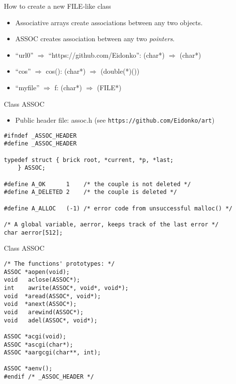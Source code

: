 \begin{frame}[fragile]{How to create a new FILE-like class}
\begin{itemize}
\item Associative arrays create associations between any two
objects.
\item ASSOC creates association between any two \emph{pointers}.
\item ``url0'' $\Rightarrow$ ``https://github.com/Eidonko'':
(char*) $\Rightarrow$ (char*)
\item ``cos''  $\Rightarrow$ cos():
(char*) $\Rightarrow$ (double(*)())
\item ``myfile'' $\Rightarrow$ f:
(char*) $\Rightarrow$ (FILE*)
\end{itemize}

\end{frame}
\begin{frame}[fragile]{Class ASSOC}
\begin{itemize}
\item Public header file: assoc.h (see \verb"https://github.com/Eidonko/art")
\end{itemize}

\begin{small}
\begin{verbatim}
#ifndef _ASSOC_HEADER
#define _ASSOC_HEADER

typedef struct { brick root, *current, *p, *last;
	} ASSOC;

#define A_OK      1    /* the couple is not deleted */
#define A_DELETED 2    /* the couple is deleted */

#define A_ALLOC   (-1) /* error code from unsuccessful malloc() */

/* A global variable, aerror, keeps track of the last error */
char aerror[512];
\end{verbatim}
\end{small}




\end{frame}
\begin{frame}[fragile]{Class ASSOC}
\begin{small}
\begin{verbatim}
/* The functions' prototypes: */
ASSOC *aopen(void);
void   aclose(ASSOC*);
int    awrite(ASSOC*, void*, void*);
void  *aread(ASSOC*, void*);
void  *anext(ASSOC*);
void   arewind(ASSOC*);
void   adel(ASSOC*, void*);

ASSOC *acgi(void);
ASSOC *ascgi(char*);
ASSOC *aargcgi(char**, int);

ASSOC *aenv();
#endif /* _ASSOC_HEADER */
\end{verbatim}
\end{small}


\end{frame}
